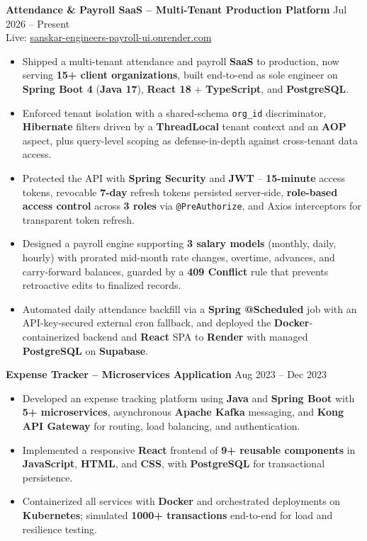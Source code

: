 \documentclass[a4paper,10pt]{article}
\begin{document}
\textbf{Attendance \& Payroll SaaS -- Multi-Tenant Production Platform} \hfill Jul 2026 -- Present \\
Live: \href{https://sanskar-engineers-payroll-ui.onrender.com/login}{sanskar-engineers-payroll-ui.onrender.com}
\begin{itemize}[leftmargin=*]
    \item Shipped a multi-tenant attendance and payroll \textbf{SaaS} to production, now serving \textbf{15+ client organizations}, built end-to-end as sole engineer on \textbf{Spring Boot 4} (\textbf{Java 17}), \textbf{React 18} + \textbf{TypeScript}, and \textbf{PostgreSQL}.
    \item Enforced tenant isolation with a shared-schema \texttt{org\_id} discriminator, \textbf{Hibernate} filters driven by a \textbf{ThreadLocal} tenant context and an \textbf{AOP} aspect, plus query-level scoping as defense-in-depth against cross-tenant data access.
    \item Protected the API with \textbf{Spring Security} and \textbf{JWT} -- \textbf{15-minute} access tokens, revocable \textbf{7-day} refresh tokens persisted server-side, \textbf{role-based access control} across \textbf{3 roles} via \texttt{@PreAuthorize}, and Axios interceptors for transparent token refresh.
    \item Designed a payroll engine supporting \textbf{3 salary models} (monthly, daily, hourly) with prorated mid-month rate changes, overtime, advances, and carry-forward balances, guarded by a \textbf{409 Conflict} rule that prevents retroactive edits to finalized records.
    \item Automated daily attendance backfill via a \textbf{Spring @Scheduled} job with an API-key-secured external cron fallback, and deployed the \textbf{Docker}-containerized backend and \textbf{React} SPA to \textbf{Render} with managed \textbf{PostgreSQL} on \textbf{Supabase}.
\end{itemize}

\textbf{Expense Tracker -- Microservices Application} \hfill Aug 2023 -- Dec 2023
\begin{itemize}[leftmargin=*]
    \item Developed an expense tracking platform using \textbf{Java} and \textbf{Spring Boot} with \textbf{5+ microservices}, asynchronous \textbf{Apache Kafka} messaging, and \textbf{Kong API Gateway} for routing, load balancing, and authentication.
    \item Implemented a responsive \textbf{React} frontend of \textbf{9+ reusable components} in \textbf{JavaScript}, \textbf{HTML}, and \textbf{CSS}, with \textbf{PostgreSQL} for transactional persistence.
    \item Containerized all services with \textbf{Docker} and orchestrated deployments on \textbf{Kubernetes}; simulated \textbf{1000+ transactions} end-to-end for load and resilience testing.
\end{itemize}
\end{document}
